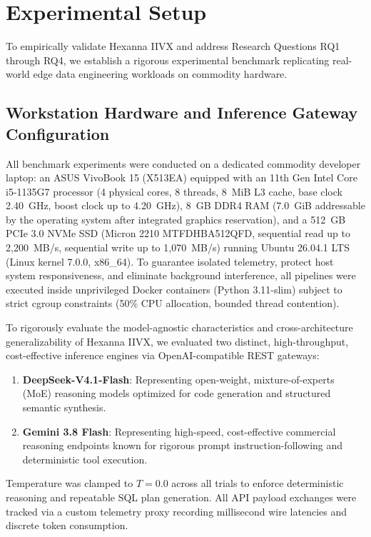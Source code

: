 \section{Experimental Setup}
\label{sec:experimental_setup}

To empirically validate Hexanna IIVX and address Research Questions RQ1 through RQ4, we establish a rigorous experimental benchmark replicating real-world edge data engineering workloads on commodity hardware.

\subsection{Workstation Hardware and Inference Gateway Configuration}
All benchmark experiments were conducted on a dedicated commodity developer laptop: an ASUS VivoBook 15 (X513EA) equipped with an 11th Gen Intel Core i5-1135G7 processor (4 physical cores, 8 threads, 8~MiB L3 cache, base clock 2.40~GHz, boost clock up to 4.20~GHz), 8~GB DDR4 RAM (7.0~GiB addressable by the operating system after integrated graphics reservation), and a 512~GB PCIe 3.0 NVMe SSD (Micron 2210 MTFDHBA512QFD, sequential read up to 2,200~MB/s, sequential write up to 1,070~MB/s) running Ubuntu 26.04.1 LTS (Linux kernel 7.0.0, x86\_64). To guarantee isolated telemetry, protect host system responsiveness, and eliminate background interference, all pipelines were executed inside unprivileged Docker containers (Python 3.11-slim) subject to strict cgroup constraints (50\% CPU allocation, bounded thread contention).

To rigorously evaluate the model-agnostic characteristics and cross-architecture generalizability of Hexanna IIVX, we evaluated two distinct, high-throughput, cost-effective inference engines via OpenAI-compatible REST gateways:
\begin{enumerate}
    \item \textbf{DeepSeek-V4.1-Flash}: Representing open-weight, mixture-of-experts (MoE) reasoning models optimized for code generation and structured semantic synthesis.
    \item \textbf{Gemini 3.8 Flash}: Representing high-speed, cost-effective commercial reasoning endpoints known for rigorous prompt instruction-following and deterministic tool execution.
\end{enumerate}
Temperature was clamped to $T = 0.0$ across all trials to enforce deterministic reasoning and repeatable SQL plan generation. All API payload exchanges were tracked via a custom telemetry proxy recording millisecond wire latencies and discrete token consumption.

